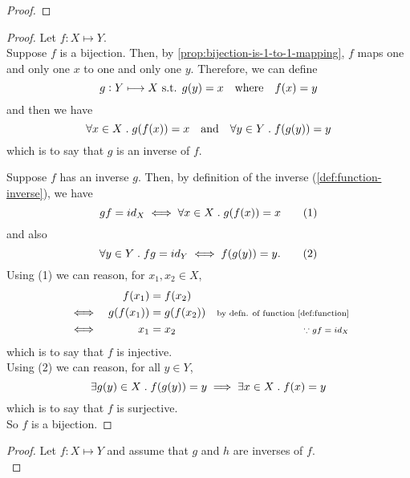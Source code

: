 \documentclass[../MathsNotesBase.tex]{subfiles}
\begin{document}
{		\bigskip
		\begin{proof}
		\end{proof}
		
		\bigskip
		\begin{proof}
			Let ${ f: X \longmapsto Y }$.\\
			
			Suppose $f$ is a bijection. Then, by \autoref{prop:bijection-is-1-to-1-mapping}, $f$ maps one and only one $x$ to one and only one $y$. Therefore, we can define
			\[ g: Y \longmapsto X \text{ s.t. } g(y) = x \hspace{10pt}\text{where}\hspace{10pt} f(x) = y \]
			and then we have
			\[ \forall x \in X \;.\; g(f(x)) = x \hspace{10pt}\text{and}\hspace{10pt} \forall y \in Y \;.\; f(g(y)) = y \]
			which is to say that $g$ is an inverse of $f$.
			
			\nl[4]
			Suppose $f$ has an inverse $g$. Then, by definition of the inverse (\ref{def:function-inverse}), we have
			\[ gf = id_X \iff \forall x \in X \;.\; g(f(x)) = x  \tag{1} \]
			and also
			\[ \forall y \in Y \;.\; fg = id_Y \iff f(g(y)) = y. \tag{2} \]
			Using (1) we can reason, for ${ x_1, x_2 \in X }$,
			\[\begin{aligned}
				&& f(x_1) &= f(x_2) \\
				&\iff & g(f(x_1)) &= g(f(x_2)) &\text{\scriptsize{by defn. of function \ref{def:function}}} \\
				&\iff & x_1 &= x_2 &\text{\scriptsize{${ \because gf = id_X }$}} \\
			\end{aligned}\]
			which is to say that $f$ is injective.\\
			Using (2) we can reason, for all ${ y \in Y }$,
			\[ \exists g(y) \in X \;.\; f(g(y)) = y \implies \exists x \in X \;.\; f(x) = y \]
			which is to say that $f$ is surjective.\\
			So $f$ is a bijection.
		\end{proof}
	
		\medskip
		\begin{proof}
			Let ${ f: X \longmapsto Y }$ and assume that $g$ and $h$ are inverses of $f$.\\
			

\end{proof}}
\end{document}
